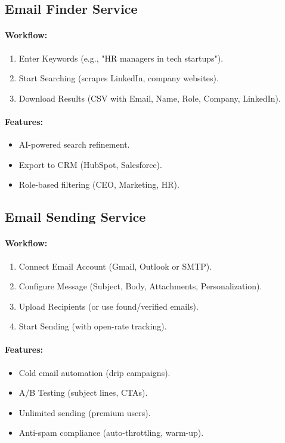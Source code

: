 \documentclass{article}
\begin{document}
\subsection{Email Finder Service}
\paragraph{Workflow:}
\begin{enumerate}
    \item Enter Keywords (e.g., "HR managers in tech startups").
    \item Start Searching (scrapes LinkedIn, company websites).
    \item Download Results (CSV with Email, Name, Role, Company, LinkedIn).
\end{enumerate}

\paragraph{Features:}
\begin{itemize}
    \item AI-powered search refinement.
    \item Export to CRM (HubSpot, Salesforce).
    \item Role-based filtering (CEO, Marketing, HR).
\end{itemize}

\subsection{Email Sending Service}
\paragraph{Workflow:}
\begin{enumerate}
    \item Connect Email Account (Gmail, Outlook or SMTP).
    \item Configure Message (Subject, Body, Attachments, Personalization).
    \item Upload Recipients (or use found/verified emails).
    \item Start Sending (with open-rate tracking).
\end{enumerate}

\paragraph{Features:}
\begin{itemize}
    \item Cold email automation (drip campaigns).
    \item A/B Testing (subject lines, CTAs).
    \item Unlimited sending (premium users).
    \item Anti-spam compliance (auto-throttling, warm-up).
\end{itemize}
\end{document}

